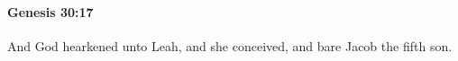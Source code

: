 
		\paragraph{Genesis 30:17} %
			\label{GENESIS-30-17}

			And God hearkened unto Leah, and she conceived, and bare Jacob the fifth son.


